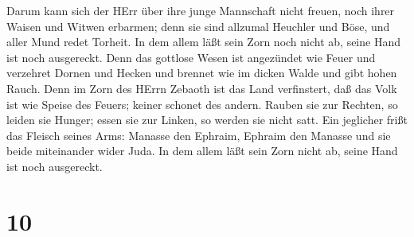  Darum kann sich der HErr über ihre junge Mannschaft nicht
freuen, noch ihrer Waisen und Witwen erbarmen; denn sie sind allzumal
Heuchler und Böse, und aller Mund redet Torheit. In dem allem läßt sein
Zorn noch nicht ab, seine Hand ist noch ausgereckt.  Denn
das gottlose Wesen ist angezündet wie Feuer und verzehret Dornen und
Hecken und brennet wie im dicken Walde und gibt hohen Rauch.
 Denn im Zorn des HErrn Zebaoth ist das Land verfinstert,
daß das Volk ist wie Speise des Feuers; keiner schonet des andern.
 Rauben sie zur Rechten, so leiden sie Hunger; essen sie
zur Linken, so werden sie nicht satt. Ein jeglicher frißt das Fleisch
seines Arms:  Manasse den Ephraim, Ephraim den Manasse und
sie beide miteinander wider Juda. In dem allem läßt sein Zorn nicht ab,
seine Hand ist noch ausgereckt.

\hypertarget{section-9}{%
\section{10}\label{section-9}}

